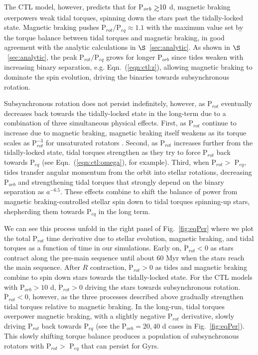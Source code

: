 \documentclass[twocolumn]{aastex61}
\def\gsim{~\rlap{$>$}{\lower 1.0ex\hbox{$\sim$}}}
\begin{document}
The CTL model, however, predicts that for P$_{orb} \gsim 10$ d, magnetic braking overpowers weak tidal torques, spinning down the stars past the tidally-locked state. Magnetic braking pushes P$_{rot}/$P$_{eq} \approx 1.1$ with the maximum value set by the torque balance between tidal torques and magnetic braking, in good agreement with the analytic calculations in $\S$~\ref{sec:analytic}. As shown in $\S$~\ref{sec:analytic}, the peak P$_{rot}/$P$_{eq}$ grows for longer P$_{orb}$ since tides weaken with increasing binary separation, e.g. Eqn.~(\ref{eqn:ctl:z}), allowing magnetic braking to dominate the spin evolution, driving the binaries towards subsynchronous rotation. 

Subsynchronous rotation does not persist indefinitely, however, as P$_{rot}$ eventually decreases back towards the tidally-locked state in the long-term due to a combination of three simultaneous physical effects.  First, as P$_{rot}$ continue to increase due to magnetic braking, magnetic braking itself weakens as its torque scales as P$_{rot}^{-3}$ for unsaturated rotators \citep{Matt2015}.  Second, as P$_{rot}$ increases further from the tidally-locked state, tidal torques strengthen as they try to force P$_{rot}$ back towards P$_{eq}$ (see Eqn.~(\ref{eqn:ctl:omega}), for example). Third, when P$_{rot} > $ P$_{eq}$, tides transfer angular momentum from the orbit into stellar rotations, decreasing P$_{orb}$ and strengthening tidal torques that strongly depend on the binary separation as $a^{-6.5}$.  These effects combine to shift the balance of power from magnetic braking-controlled stellar spin down to tidal torques spinning-up stars, shepherding them towards P$_{eq}$ in the long term. 

We can see this process unfold in the right panel of Fig.~\ref{fig:eqPer} where we plot the total P$_{rot}$ time derivative due to stellar evolution, magnetic braking, and tidal torques as a function of time in our simulations. Early on, $\dot{\mathrm{P}}_{rot} < 0$ as stars contract along the pre-main sequence until about 60 Myr when the stars reach the main sequence. After $R$ contraction, $\dot{\mathrm{P}}_{rot} > 0$ as tides and magnetic braking combine to spin down stars towards the tidally-locked state. For the CTL models with P$_{orb} > 10$ d, $\dot{\mathrm{P}}_{rot} > 0$ driving the stars towards subsynchronous rotation. $\ddot{\mathrm{P}}_{rot} < 0$, however, as the three processes described above gradually strengthen tidal torques relative to magnetic braking.  In the long-run, tidal torques overpower magnetic braking, with a slightly negative P$_{rot}$ derivative, slowly driving P$_{rot}$ back towards P$_{eq}$ (see the P$_{orb} = 20, 40$ d cases in Fig.~\ref{fig:eqPer}). This slowly shifting torque balance produces a population of subsynchronous rotators with P$_{rot} > $ P$_{eq}$ that can persist for Gyrs.  
\end{document}

